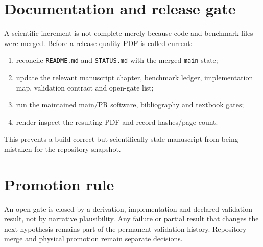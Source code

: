 \section{Documentation and release gate}
A scientific increment is not complete merely because code and benchmark files were merged.  Before a release-quality PDF is called current:
\begin{enumerate}
\item reconcile \texttt{README.md} and \texttt{STATUS.md} with the merged \texttt{main} state;
\item update the relevant manuscript chapter, benchmark ledger, implementation map, validation contract and open-gate list;
\item run the maintained main/PR software, bibliography and textbook gates;
\item render-inspect the resulting PDF and record hashes/page count.
\end{enumerate}
This prevents a build-correct but scientifically stale manuscript from being mistaken for the repository snapshot.

\section{Promotion rule}
An open gate is closed by a derivation, implementation and declared validation result, not by narrative plausibility.  Any failure or partial result that changes the next hypothesis remains part of the permanent validation history.  Repository merge and physical promotion remain separate decisions.
